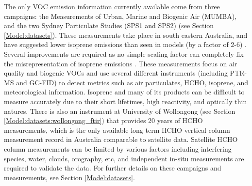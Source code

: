     
    The only VOC emission information currently available come from three campaigns: the Measurements of Urban, Marine and Biogenic Air (MUMBA), and the two Sydney Particulate Studies (SPS1 and SPS2) (see Section \ref{Model:datasets}).
    These measurements take place in south eastern Australia, and have suggested lower isoprene emissions than seen in models (by a factor of 2-6) \parencite{Emmerson2016}.
    Several improvements are required as no simple scaling factor can completely fix the misrepresentation of isoprene emissions \parencite{Emmerson2016}.
    These measurements focus on air quality and biogenic VOCs and use several different instruments (including PTR-MS and GC-FID) to detect metrics such as air particulates, HCHO, isoprene, and meteorological information.
    Isoprene and many of its products can be difficult to measure accurately due to their short lifetimes, high reactivity, and optically thin natures.
    There is also an instrument at University of Wollongong (see Section \ref{Model:datasets:wollongong_ftir}) that provides 20 years of HCHO measurements, which is the only available long term HCHO vertical column measurement record in Australia comparable to satellite data. 
    Satellite HCHO column measurements can be limited by various factors including interfering species, water, clouds, orography, etc, and independent in-situ measurements are required to validate the data. %
    For further details on these campaigns and measurements, see Section \ref{Model:datasets}.
    
